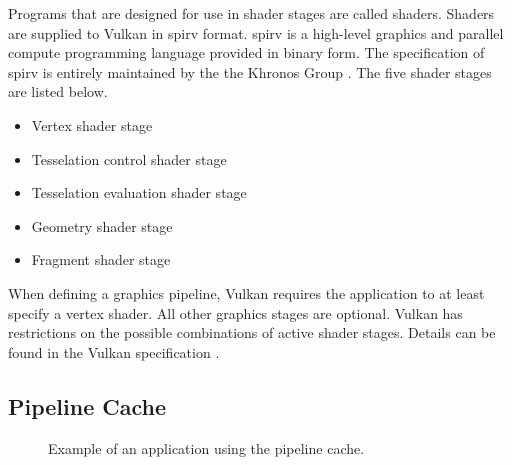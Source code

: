    Programs that are designed for use in shader stages are called shaders. Shaders are supplied to Vulkan in \gls{spirv} format. \gls{spirv} is a high-level graphics and parallel compute programming language provided in binary form. The specification of \gls{spirv} is entirely maintained by the the Khronos Group \cite{spirvspecprov}. The five shader stages are listed below.

    \begin{itemize}
      \item Vertex shader stage
      \item Tesselation control shader stage
      \item Tesselation evaluation shader stage
      \item Geometry shader stage
      \item Fragment shader stage
    \end{itemize}

    When defining a graphics pipeline, Vulkan requires the \gls{application} to at least specify a vertex shader. All other graphics stages are optional. Vulkan has restrictions on the possible combinations of active shader stages. Details can be found in the Vulkan specification \cite{vkspec}.


    \subsection{Pipeline Cache}
    \label{subsec:PipelineCache}


      \begin{figure}
        \centering
        \caption{Example of an \gls{application} using the pipeline cache.}
        \label{fig:PipelineCache}
      \end{figure}

